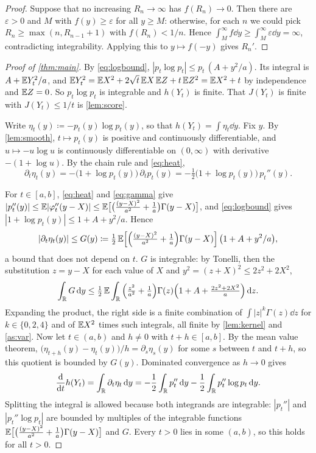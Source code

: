 \documentclass{saim-blog}
\begin{document}
\begin{proof}
Suppose that no increasing $R_n\to\infty$ has $f(R_n)\to0$. Then there are $\varepsilon>0$ and $M$ with $f(y)\ge\varepsilon$ for all $y\ge M$: otherwise, for each $n$ we could pick $R_n\ge\max(n,R_{n-1}+1)$ with $f(R_n)<1/n$. Hence $\int_M^\infty f\dd y\ge\int_M^\infty\varepsilon\dd y=\infty$, contradicting integrability. Applying this to $y\mapsto f(-y)$ gives $R_n'$.
\end{proof}

\begin{proof}[Proof of \cref{thm:main}]
By \eqref{eq:logbound}, $|p_t\log p_t|\le p_t\,(A+y^2/a)$. Its integral is $A+\mathbb{E} Y_t^2/a$, and $\mathbb{E} Y_t^2=\mathbb{E} X^2+2\sqrt t\,\mathbb{E} X\,\mathbb{E} Z+t\,\mathbb{E} Z^2=\mathbb{E} X^2+t$ by independence and $\mathbb{E} Z=0$. So $p_t\log p_t$ is integrable and $h(Y_t)$ is finite. That $J(Y_t)$ is finite with $J(Y_t)\le1/t$ is \cref{lem:score}.

Write $\eta_t(y)\coloneqq-p_t(y)\log p_t(y)$, so that $h(Y_t)=\int\eta_t\dd y$. Fix $y$. By \cref{lem:smooth}, $t\mapsto p_t(y)$ is positive and continuously differentiable, and $u\mapsto-u\log u$ is continuously differentiable on $(0,\infty)$ with derivative $-(1+\log u)$. By the chain rule and \eqref{eq:heat},
\[
\partial_t\eta_t(y)=-\big(1+\log p_t(y)\big)\,\partial_tp_t(y)=-\tfrac12\big(1+\log p_t(y)\big)\,p_t''(y).
\]

For $t\in[a,b]$, \eqref{eq:heat} and \eqref{eq:gamma} give $|p_t''(y)|\le\mathbb{E}|\varphi_t''(y-X)|\le\mathbb{E}\big[\big(\tfrac{(y-X)^2}{a^2}+\tfrac1a\big)\Gamma(y-X)\big]$, and \eqref{eq:logbound} gives $|1+\log p_t(y)|\le1+A+y^2/a$. Hence
\[
|\partial_t\eta_t(y)|\le G(y)\coloneqq\tfrac12\,\mathbb{E}\Big[\Big(\tfrac{(y-X)^2}{a^2}+\tfrac1a\Big)\Gamma(y-X)\Big]\,\big(1+A+y^2/a\big),
\]
a bound that does not depend on $t$. $G$ is integrable: by Tonelli, then the substitution $z=y-X$ for each value of $X$ and $y^2=(z+X)^2\le2z^2+2X^2$,
\[
\int_{\mathbb{R}}G\mathop{}\!\mathrm{d} y\le\tfrac12\,\mathbb{E}\int_{\mathbb{R}}\Big(\tfrac{z^2}{a^2}+\tfrac1a\Big)\Gamma(z)\Big(1+A+\tfrac{2z^2+2X^2}{a}\Big)\mathop{}\!\mathrm{d} z .
\]
Expanding the product, the right side is a finite combination of $\int|z|^k\Gamma(z)\dd z$ for $k\in\{0,2,4\}$ and of $\mathbb{E} X^2$ times such integrals, all finite by \cref{lem:kernel} and \cref{as:var}. Now let $t\in(a,b)$ and $h\ne0$ with $t+h\in[a,b]$. By the mean value theorem, $\big(\eta_{t+h}(y)-\eta_t(y)\big)/h=\partial_s\eta_s(y)$ for some $s$ between $t$ and $t+h$, so this quotient is bounded by $G(y)$. Dominated convergence as $h\to0$ gives
\[
\frac{\mathop{}\!\mathrm{d}}{\mathop{}\!\mathrm{d} t}h(Y_t)=\int_{\mathbb{R}}\partial_t\eta_t\mathop{}\!\mathrm{d} y=-\frac12\int_{\mathbb{R}}p_t''\mathop{}\!\mathrm{d} y-\frac12\int_{\mathbb{R}}p_t''\log p_t\mathop{}\!\mathrm{d} y .
\]
Splitting the integral is allowed because both integrands are integrable: $|p_t''|$ and $|p_t''\log p_t|$ are bounded by multiples of the integrable functions $\mathbb{E}\big[\big(\tfrac{(y-X)^2}{a^2}+\tfrac1a\big)\Gamma(y-X)\big]$ and $G$. Every $t>0$ lies in some $(a,b)$, so this holds for all $t>0$.


\end{proof}
\end{document}
